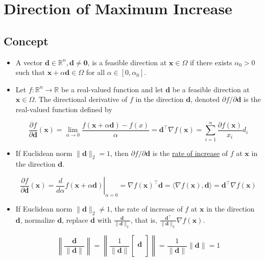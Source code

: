 \section{Direction of Maximum Increase}

\subsection{Concept}
\begin{itemize}
	\item A vector \(\boldsymbol{d} \in \mathbb{R}^{n}, \boldsymbol{d} \neq \boldsymbol{0}\), is a feasible direction at \( \boldsymbol{x} \in \Omega\) if there exists \(\alpha_{0}>0\) such that \(\boldsymbol{x}+\alpha \boldsymbol{d} \in \Omega\) for all \( \alpha \in\left[0, \alpha_{0}\right] \).

	\item Let \(f: \mathbb{R}^{n} \rightarrow \mathbb{R}\) be a real-valued function and let \(\boldsymbol{d}\) be a feasible direction at \(\boldsymbol{x} \in \Omega \). The directional derivative of \(f\) in the direction \(\boldsymbol{d}\), denoted \(\partial f / \partial \boldsymbol{d}\) is the real-valued function defined by
	
	\[
	\frac{\partial f}{\partial \boldsymbol{d}}(\boldsymbol{x})=\lim _{\alpha \rightarrow 0} \frac{f(\boldsymbol{x}+\alpha \boldsymbol{d})-f(x)}{\alpha} = \boldsymbol{d}^{\top} \nabla f(\boldsymbol{x})
	= \sum_{i=1}^{n} \frac{\partial f(\boldsymbol{x})}{x_i} d_i
	\]

	\item If Euclidean norm \(\|\boldsymbol{d}\|_2=1\), then \(\partial f / \partial \boldsymbol{d}\) is the \underline{rate of increase} of \(f\) at \(\boldsymbol{x}\) in the direction \(\boldsymbol{d}\).
	
	\[\frac{\partial f}{\partial \boldsymbol{d}}(\boldsymbol{x})=\left.\frac{d}{d \alpha} f(\boldsymbol{x}+\alpha \boldsymbol{d})\right|_{\alpha=0}=\nabla f(\boldsymbol{x})^{\top} \boldsymbol{d}=\langle\nabla f(\boldsymbol{x}), \boldsymbol{d}\rangle=\boldsymbol{d}^{\top} \nabla f(\boldsymbol{x}) \]

	\item If Euclidean norm \(\|\boldsymbol{d}\|_2 \neq 1\), the rate of increase of \(f\) at \(\boldsymbol{x}\) in the direction \(\boldsymbol{d}\), normalize \(\boldsymbol{d}\), replace \(\boldsymbol{d}\) with \(\frac{\boldsymbol{d}}{\|\boldsymbol{d}\|_2}\), that is, \(\frac{\boldsymbol{d}^{\top}}{\|\boldsymbol{d}\|_2} \nabla f(\boldsymbol{x}) \).
	
	\[ \left\| \frac{\boldsymbol{d}}{\|\boldsymbol{d}\|} \right\| 
	= \left\| \frac{1}{\|\boldsymbol{d}\|}  \left[ \begin{array}{c} \\ \boldsymbol{d} \\ \\ \end{array} \right]\right \|
	= \frac{1}{\|\boldsymbol{d}\|}  \|\boldsymbol{d}\|
	= 1 \]
\end{itemize}


